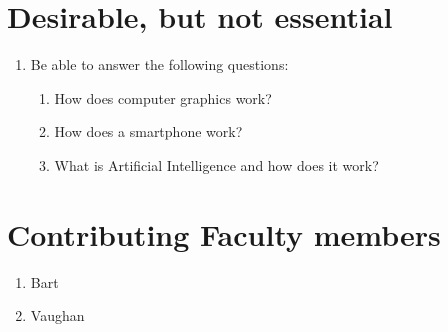 \documentclass[draft]{article}
\begin{document}
\section{Desirable, but not essential}

\begin{enumerate}

\item Be able to answer the following questions: 

  \begin{enumerate}
    \item How does computer graphics work?
    \item How does a smartphone work?
    \item What is Artificial Intelligence and how does it work?
  \end{enumerate}

\end{enumerate}

\section{Contributing Faculty members}

\begin{enumerate}
\item Bart 
\item Vaughan
\end{enumerate}

  
\end{document}
